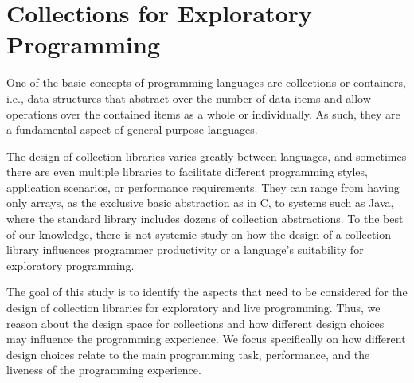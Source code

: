 \documentclass[sigconf, 10pt]{acmart}
\begin{document}
\maketitle


\section{Collections for Exploratory Programming}


One of the basic concepts of programming languages are collections or containers, i.e.,
data structures that abstract over the number of data items
and allow operations over the contained items as a whole or individually.
As such, they are a fundamental aspect of general purpose languages.


The design of collection libraries varies greatly between languages,
and sometimes there are even multiple libraries
to facilitate different programming styles, application scenarios, or performance requirements.
They can range from having only arrays,
as the exclusive basic abstraction as in C,
to systems such as Java,
where the standard library includes dozens of collection abstractions.
To the best of our knowledge,
there is not systemic study on how the design of a collection library
influences programmer productivity
or a language's suitability for exploratory programming.

The goal of this study is to identify the aspects
that need to be considered for the design of collection libraries
for exploratory and live programming.
%
%
Thus, we reason about the design space for collections
and how different design choices may influence the programming experience.
We focus specifically on how different design choices relate to the main
programming task, performance, and the liveness of the programming experience.
\end{document}
